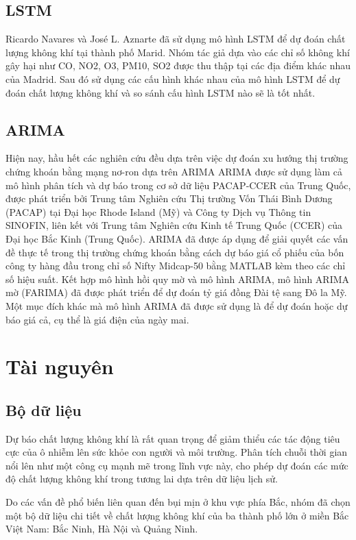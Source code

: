 \documentclass[conference]{IEEEtran}
\begin{document}
\subsection{LSTM}
Ricardo Navares và José L. Aznarte đã sử dụng mô hình LSTM để dự đoán chất lượng không khí tại thành phố Marid. Nhóm tác giả dựa vào các chỉ số không khí gây hại như CO, NO2, O3, PM10, SO2 được thu thập tại các địa điểm khác nhau của Madrid. Sau đó sử dụng các cấu hình khác nhau của mô hình LSTM để dự đoán chất lượng không khí và so sánh cấu hình LSTM nào sẽ là tốt nhất. \cite{b12}

\subsection{ARIMA}
Hiện nay, hầu hết các nghiên cứu đều dựa trên việc dự đoán xu hướng thị trường chứng khoán bằng mạng nơ-ron dựa trên ARIMA \cite{b13} ARIMA được sử dụng làm cả mô hình phân tích và dự báo trong cơ sở dữ liệu PACAP‐CCER của Trung Quốc, được phát triển bởi Trung tâm Nghiên cứu Thị trường Vốn Thái Bình Dương (PACAP) tại Đại học Rhode Island (Mỹ) và Công ty Dịch vụ Thông tin SINOFIN, liên kết với Trung tâm Nghiên cứu Kinh tế Trung Quốc (CCER) của Đại học Bắc Kinh (Trung Quốc). \cite{b14} ARIMA đã được áp dụng để giải quyết các vấn đề thực tế trong thị trường chứng khoán bằng cách dự báo giá cổ phiếu của bốn công ty hàng đầu trong chỉ số Nifty Midcap-50 bằng MATLAB kèm theo các chỉ số hiệu suất. \cite{b15} Kết hợp mô hình hồi quy mờ và mô hình ARIMA, mô hình ARIMA mờ (FARIMA) đã được phát triển để dự đoán tỷ giá đồng Đài tệ sang Đô la Mỹ. \cite{b16} Một mục đích khác mà mô hình ARIMA đã được sử dụng là để dự đoán hoặc dự báo giá cả, cụ thể là giá điện của ngày mai.
\section{Tài nguyên}
\subsection{Bộ dữ liệu}
Dự báo chất lượng không khí là rất quan trọng để giảm thiểu các tác động tiêu cực của ô nhiễm lên sức khỏe con người và môi trường. Phân tích chuỗi thời gian nổi lên như một công cụ mạnh mẽ trong lĩnh vực này, cho phép dự đoán các mức độ chất lượng không khí trong tương lai dựa trên dữ liệu lịch sử.

Do các vấn đề phổ biến liên quan đến bụi mịn ở khu vực phía Bắc, nhóm đã chọn một bộ dữ liệu chi tiết về chất lượng không khí của ba thành phố lớn ở miền Bắc Việt Nam: Bắc Ninh, Hà Nội và Quảng Ninh.
\end{document}
